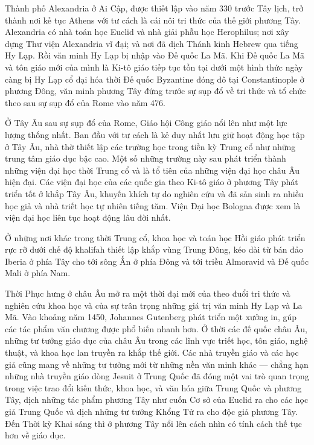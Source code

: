 \documentclass[../thesis.tex]{subfiles}
\begin{document}
Thành phố Alexandria ở Ai Cập, được thiết lập vào năm 330 trước Tây lịch, trở thành nơi kế tục Athens với tư cách là cái nôi tri thức của thế giới phương Tây. Alexandria có nhà toán học Euclid và nhà giải phẫu học Herophilus; nơi xây dựng Thư viện Alexandria vĩ đại; và nơi đã dịch Thánh kinh Hebrew qua tiếng Hy Lạp. Rồi văn minh Hy Lạp bị nhập vào Đế quốc La Mã. Khi Đế quốc La Mã và tôn giáo mới của mình là Ki-tô giáo tiếp tục tồn tại dưới một hình thức ngày càng bị Hy Lạp cổ đại hóa thời Đế quốc Byzantine đóng đô tại Constantinople ở phương Đông, văn minh phương Tây đứng trước sự sụp đổ về tri thức và tổ chức theo sau sự sụp đổ của Rome vào năm 476.

Ở Tây Âu sau sự sụp đổ của Rome, Giáo hội Công giáo nổi lên như một lực lượng thống nhất. Ban đầu với tư cách là kẻ duy nhất lưu giữ hoạt động học tập ở Tây Âu, nhà thờ thiết lập các trường học trong tiền kỳ Trung cổ như những trung tâm giáo dục bậc cao. Một số những trường này sau phát triển thành những viện đại học thời Trung cổ và là tổ tiên của những viện đại học châu Âu hiện đại. Các viện đại học của các quốc gia theo Ki-tô giáo ở phương Tây phát triển tốt ở khắp Tây Âu, khuyến khích tự do nghiên cứu và đã sản sinh ra nhiều học giả và nhà triết học tự nhiên tiếng tăm. Viện Đại học Bologna được xem là viện đại học liên tục hoạt động lâu đời nhất.

Ở những nơi khác trong thời Trung cổ, khoa học và toán học Hồi giáo phát triển rực rỡ dưới chế độ khalifah thiết lập khắp vùng Trung Đông, kéo dài từ bán đảo Iberia ở phía Tây cho tới sông Ấn ở phía Đông và tới triều Almoravid và Đế quốc Mali ở phía Nam.

Thời Phục hưng ở châu Âu mở ra một thời đại mới của theo đuổi tri thức và nghiên cứu khoa học và của sự trân trọng những giá trị văn minh Hy Lạp và La Mã. Vào khoảng năm 1450, Johannes Gutenberg phát triển một xưởng in, gúp các tác phẩm văn chương được phổ biến nhanh hơn. Ở thời các đế quốc châu Âu, những tư tưởng giáo dục của châu Âu trong các lĩnh vực triết học, tôn giáo, nghệ thuật, và khoa học lan truyền ra khắp thế giới. Các nhà truyền giáo và các học giả cũng mang về những tư tưởng mới từ những nền văn minh khác — chẳng hạn những nhà truyền giáo dòng Jesuit ở Trung Quốc đã đóng một vai trò quan trọng trong việc trao đổi kiến thức, khoa học, và văn hóa giữa Trung Quốc và phương Tây, dịch những tác phẩm phương Tây như cuốn Cơ sở của Euclid ra cho các học giả Trung Quốc và dịch những tư tưởng Khổng Tử ra cho độc giả phương Tây. Đến Thời kỳ Khai sáng thì ở phương Tây nổi lên cách nhìn có tính cách thế tục hơn về giáo dục.
\end{document}
